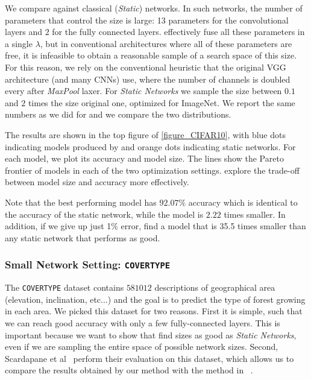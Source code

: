 We compare against classical (\textit{Static}) networks. In such networks, the
number of parameters that control the size is large: 13 parameters for the
convolutional layers and $2$ for the fully connected layers. \shrink
effectively fuse all these parameters in a single $\lambda$, but in conventional
architectures where all of these parameters are free, it is infeasible to obtain
a reasonable sample of a search space of this size. For this reason, we rely on
the conventional heuristic that the original VGG architecture (and many CNNs)
use, where the number of channels is doubled every after \textit{MaxPool} laxer.
For \textit{Static Networks} we sample the size between $0.1$ and $2$ times the size
original one, optimized for ImageNet. We report the same numbers as we did for
\shrink and we compare the two distributions. 

The results are shown in the top figure of \cref{figure_CIFAR10}, with blue dots
indicating models produced by \shrink and orange dots indicating static networks. 
For each
model, we plot its accuracy and model size. The lines show the Pareto frontier
of models in each of the two optimization settings. \shrink explore the
trade-off between model size and accuracy more effectively. 

Note that the best performing \shrink model has $92.07\%$ accuracy which
is identical to the accuracy of the static network, while the \shrink model
is $2.22$ times smaller. In addition, if we give up just 1\% error, \shrink
find a model that is 35.5 times smaller than any static network that performs
as good.

\subsubsection{Small Network Setting: \texttt{COVERTYPE}}

The \texttt{COVERTYPE} \cite{Blackard:1998:CNN:928509} dataset contains $581012$
descriptions of geographical area (elevation, inclination, etc...) and the goal
is to predict the type of forest growing in each area. We picked this dataset
for two reasons. First it is simple, such that we can reach good accuracy with
only a few fully-connected layers. This is important because we want to show
that \shrink find sizes as good as \textit{Static Networks}, even if
we are sampling the entire space of possible network sizes. Second, Scardapane
et al~\cite{Scardapane2017} perform their evaluation on this dataset, which
allows us to compare the results obtained by our method with the method in
~\cite{Scardapane2017}.


